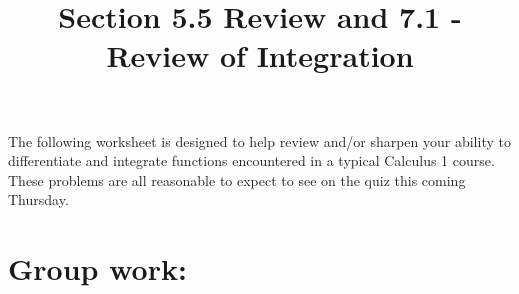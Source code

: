 \documentclass[]{ximera}
\title{Section 5.5 Review and 7.1 - Review of Integration}
\begin{document}
\begin{abstract}		\end{abstract}
\maketitle



The following worksheet is designed to help review and/or sharpen your ability to differentiate and integrate functions encountered in a typical Calculus 1 course.  These problems are all reasonable to expect to see on the quiz this coming Thursday.


\section{Group work:}
\end{document}
